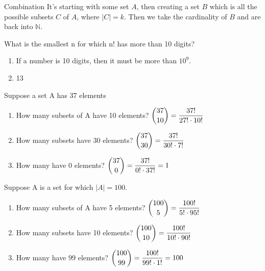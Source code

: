\documentclass[openany, 12pt]{book}
\begin{document}
\begin{intuition}{Combination}{}
	It's starting with some set $A$, then creating a set $B$ which is all the
	possible subsets $C$ of $A$, where $|C| = k$.   Then we take the cardinality of $B$
	and are back into $\mathbb{N}$.
\end{intuition}

\begin{exercise}{}{}
	What is the smallest n for which n! has more than 10 digits?
	\begin{enumerate}[label={\textbullet}, leftmargin=*, itemsep=0pt, parsep=0pt]
		\item If a number is 10 digits, then it must be more than $10^{9}$.
		\item 13
	\end{enumerate}
\end{exercise}

\begin{exercise}{}{}
	Suppose a set A has 37 elements
	\begin{enumerate}[label = {(\arabic*)}]
		\item How many subsets of A have 10 elements?
		      $\dbinom{37}{10} = \dfrac{37!}{27! \cdot10!}$
		\item How many subsets have 30 elements?
		      $\dbinom{37}{30} = \dfrac{37!}{30! \cdot7!}$
		\item How many have 0 elements?
		      $\dbinom{37}{0} = \dfrac{37!}{0! \cdot37!}=1$
	\end{enumerate}
\end{exercise}

\begin{exercise}{}{}
	Suppose A is a set for which $|A| = 100$.
	\begin{enumerate}[label = {(\arabic*)}]
		\item How many subsets of A have 5 elements?
		      $\dbinom{100}{5} = \dfrac{100!}{5! \cdot95!}$
		\item How many subsets have 10 elements?
		      $\dbinom{100}{10} = \dfrac{100!}{10! \cdot90!}$
		\item How many have 99 elements?
		      $\dbinom{100}{99} = \dfrac{100!}{99! \cdot1!}= 100$
	\end{enumerate}
\end{exercise}
\end{document}

